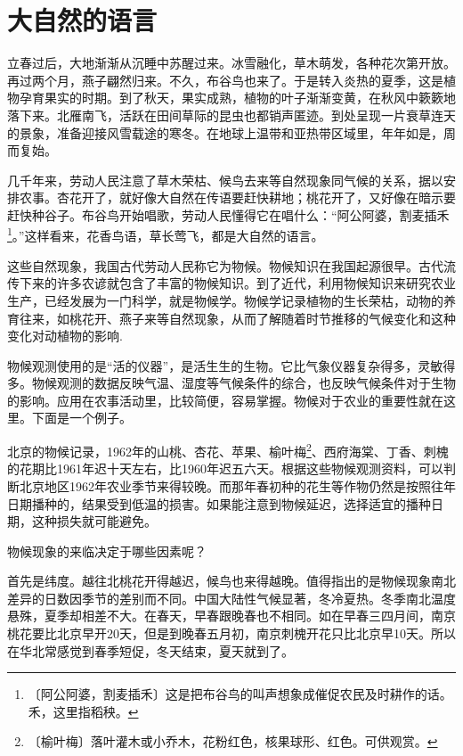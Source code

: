 \documentclass[12pt,UTF-8,openany]{ctexbook}
\begin{document}
\chapter{大自然的语言}

\begin{large}
    
    立春过后，大地渐渐从沉睡中苏醒过来。冰雪融化，草木萌发，各种花次第开放。再过两个月，燕子翩然归来。不久，布谷鸟也来了。于是转入炎热的夏季，这是植物孕育果实的时期。到了秋天，果实成熟，植物的叶子渐渐变黄，在秋风中簌簌地落下来。北雁南飞，活跃在田间草际的昆虫也都销声匿迹。到处呈现一片衰草连天的景象，准备迎接风雪载途的寒冬。在地球上温带和亚热带区域里，年年如是，周而复始。
    
    几千年来，劳动人民注意了草木荣枯、候鸟去来等自然现象同气候的关系，据以安排农事。杏花开了，就好像大自然在传语要赶快耕地；桃花开了，又好像在暗示要赶快种谷子。布谷鸟开始唱歌，劳动人民懂得它在唱什么：“阿公阿婆，割麦插禾\footnote{〔阿公阿婆，割麦插禾〕这是把布谷鸟的叫声想象成催促农民及时耕作的话。禾，这里指稻秧。}。”这样看来，花香鸟语，草长莺飞，都是大自然的语言。
    
    这些自然现象，我国古代劳动人民称它为物候。物候知识在我国起源很早。古代流传下来的许多农谚就包含了丰富的物候知识。到了近代，利用物候知识来研究农业生产，已经发展为一门科学，就是物候学。物候学记录植物的生长荣枯，动物的养育往来，如桃花开、燕子来等自然现象，从而了解随着时节推移的气候变化和这种变化对动植物的影响.
    
    物候观测使用的是“活的仪器”，是活生生的生物。它比气象仪器复杂得多，灵敏得多。物候观测的数据反映气温、湿度等气候条件的综合，也反映气候条件对于生物的影响。应用在农事活动里，比较简便，容易掌握。物候对于农业的重要性就在这里。下面是一个例子。
    
    北京的物候记录，1962年的山桃、杏花、苹果、榆叶梅\footnote{〔榆叶梅〕落叶灌木或小乔木，花粉红色，核果球形、红色。可供观赏。}、西府海棠、丁香、刺槐的花期比1961年迟十天左右，比1960年迟五六天。根据这些物候观测资料，可以判断北京地区1962年农业季节来得较晚。而那年春初种的花生等作物仍然是按照往年日期播种的，结果受到低温的损害。如果能注意到物候延迟，选择适宜的播种日期，这种损失就可能避免。
    
    物候现象的来临决定于哪些因素呢？
    
    首先是纬度。越往北桃花开得越迟，候鸟也来得越晚。值得指出的是物候现象南北差异的日数因季节的差别而不同。中国大陆性气候显著，冬冷夏热。冬季南北温度悬殊，夏季却相差不大。在春天，早春跟晚春也不相同。如在早春三四月间，南京桃花要比北京早开20天，但是到晚春五月初，南京刺槐开花只比北京早10天。所以在华北常感觉到春季短促，冬天结束，夏天就到了。
    

\end{large}
\end{document}
